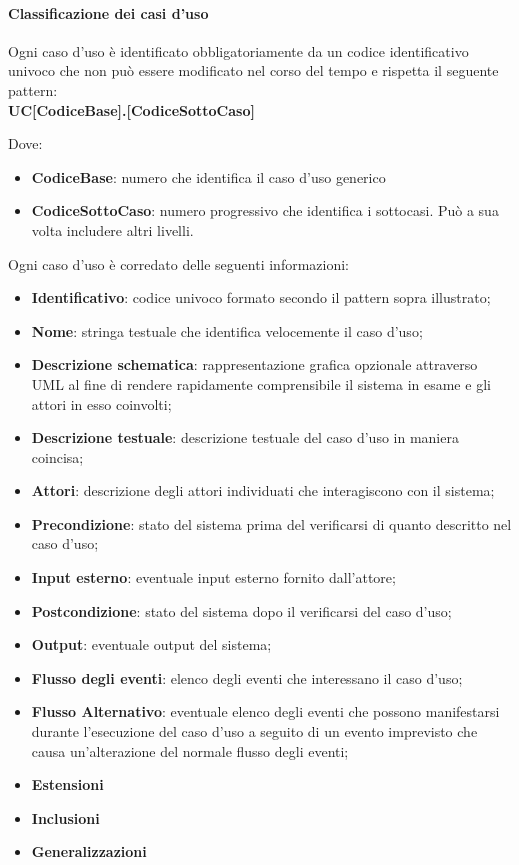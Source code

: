 \paragraph{Classificazione dei casi d'uso}
Ogni caso d'uso è identificato obbligatoriamente da un codice identificativo univoco che non può essere modificato nel corso del tempo e rispetta il seguente pattern:\\
\textbf{UC[CodiceBase].[CodiceSottoCaso]}

Dove:

\begin{itemize}
\item \textbf{CodiceBase}: numero che identifica il caso d'uso generico
\item \textbf{CodiceSottoCaso}: numero progressivo che identifica i sottocasi.  Può a sua volta includere altri livelli.
\end{itemize}

Ogni caso d'uso è corredato delle seguenti informazioni:

\begin{itemize}
\item \textbf{Identificativo}: codice univoco formato secondo il pattern sopra illustrato;
\item \textbf{Nome}: stringa testuale che identifica velocemente il caso d'uso;
\item \textbf{Descrizione schematica}: rappresentazione grafica opzionale attraverso UML al fine di rendere rapidamente comprensibile il sistema in esame e gli attori in esso coinvolti;
\item \textbf{Descrizione testuale}: descrizione testuale del caso d'uso in maniera coincisa;
\item \textbf{Attori}: descrizione degli attori individuati che interagiscono con il sistema;
\item \textbf{Precondizione}: stato del sistema prima del verificarsi di quanto descritto nel caso d'uso;
\item \textbf{Input esterno}: eventuale input esterno fornito dall'attore;
\item \textbf{Postcondizione}: stato del sistema dopo il verificarsi del caso d'uso;
\item \textbf{Output}: eventuale output del sistema;
\item \textbf{Flusso degli eventi}: elenco degli eventi che interessano il caso d'uso;
\item \textbf{Flusso Alternativo}: eventuale elenco degli eventi che possono manifestarsi durante l'esecuzione del caso d'uso a seguito di un evento imprevisto che causa un'alterazione del normale flusso degli eventi;
\item \textbf{Estensioni}
\item \textbf{Inclusioni}
\item \textbf{Generalizzazioni}
\end{itemize}





